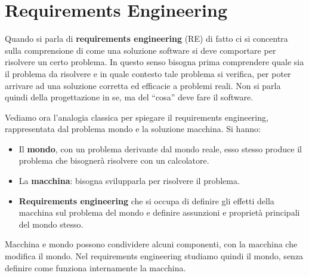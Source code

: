 \chapter{Requirements Engineering}
Quando si parla di \textbf{requirements engineering} (RE) di fatto ci si concentra
sulla comprensione di come una soluzione software si deve comportare per risolvere
un certo problema. In questo senso bisogna prima comprendere quale sia il problema
da risolvere e in quale contesto tale problema si verifica, per poter arrivare
ad una soluzione corretta ed efficacie a problemi reali. Non si parla quindi
della progettazione in se, ma del “cosa” deve fare il software.

Vediamo ora l'analogia classica per spiegare il requirements engineering,
rappresentata dal problema mondo e la soluzione macchina. Si hanno:
\begin{itemize}
      \item Il \textbf{mondo}, con un problema derivante dal mondo reale, esso
            stesso produce il problema che bisognerà risolvere con un calcolatore.
      \item La \textbf{macchina}: bisogna svilupparla per risolvere il problema.
      \item \textbf{Requirements engineering} che si occupa di definire gli effetti
            della macchina sul problema del mondo e definire assunzioni e proprietà
            principali del mondo stesso.
\end{itemize}
Macchina e mondo possono condividere alcuni componenti, con la macchina che
modifica il mondo. Nel requirements engineering studiamo quindi il mondo, senza
definire come funziona internamente la macchina.

